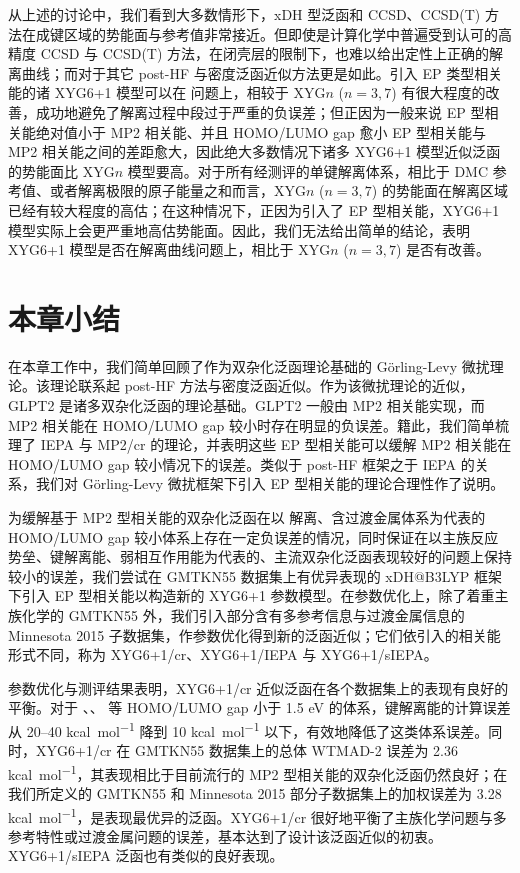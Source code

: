 从上述的讨论中，我们看到大多数情形下，xDH 型泛函和 CCSD、CCSD(T) 方法在成键区域的势能面与参考值非常接近。但即使是计算化学中普遍受到认可的高精度 CCSD 与 CCSD(T) 方法，在闭壳层的限制下，也难以给出定性上正确的解离曲线；而对于其它 post-HF 与密度泛函近似方法更是如此。引入 EP 类型相关能的诸 XYG6+1 模型可以在  问题上，相较于 XYG$n$ ($n=3,7$) 有很大程度的改善，成功地避免了解离过程中段过于严重的负误差；但正因为一般来说 EP 型相关能绝对值小于 MP2 相关能、并且 HOMO/LUMO gap 愈小 EP 型相关能与 MP2 相关能之间的差距愈大，因此绝大多数情况下诸多 XYG6+1 模型近似泛函的势能面比 XYG$n$ 模型要高。对于所有经测评的单键解离体系，相比于 DMC 参考值、或者解离极限的原子能量之和而言，XYG$n$ ($n=3,7$) 的势能面在解离区域已经有较大程度的高估；在这种情况下，正因为引入了 EP 型相关能，XYG6+1 模型实际上会更严重地高估势能面。因此，我们无法给出简单的结论，表明 XYG6+1 模型是否在解离曲线问题上，相比于 XYG$n$ ($n=3,7$) 是否有改善。

\section{本章小结}

在本章工作中，我们简单回顾了作为双杂化泛函理论基础的 G\"orling-Levy 微扰理论。该理论联系起 post-HF 方法与密度泛函近似。作为该微扰理论的近似，GLPT2 是诸多双杂化泛函的理论基础。GLPT2 一般由 MP2 相关能实现，而 MP2 相关能在 HOMO/LUMO gap 较小时存在明显的负误差。籍此，我们简单梳理了 IEPA 与 MP2/cr 的理论，并表明这些 EP 型相关能可以缓解 MP2 相关能在 HOMO/LUMO gap 较小情况下的误差。类似于 post-HF 框架之于 IEPA 的关系，我们对 G\"orling-Levy 微扰框架下引入 EP 型相关能的理论合理性作了说明。

为缓解基于 MP2 型相关能的双杂化泛函在以  解离、含过渡金属体系为代表的 HOMO/LUMO gap 较小体系上存在一定负误差的情况，同时保证在以主族反应势垒、键解离能、弱相互作用能为代表的、主流双杂化泛函表现较好的问题上保持较小的误差，我们尝试在 GMTKN55 数据集上有优异表现的 xDH@B3LYP 框架下引入 EP 型相关能以构造新的 XYG6+1 参数模型。在参数优化上，除了着重主族化学的 GMTKN55 外，我们引入部分含有多参考信息与过渡金属信息的 Minnesota 2015 子数据集，作参数优化得到新的泛函近似；它们依引入的相关能形式不同，称为 XYG6+1/cr、XYG6+1/IEPA 与 XYG6+1/sIEPA。

参数优化与测评结果表明，XYG6+1/cr 近似泛函在各个数据集上的表现有良好的平衡。对于 、、 等 HOMO/LUMO gap 小于 1.5 eV 的体系，键解离能的计算误差从 20--40 \si{kcal.mol^{-1}} 降到 10 \si{kcal.mol^{-1}} 以下，有效地降低了这类体系误差。同时，XYG6+1/cr 在 GMTKN55 数据集上的总体 WTMAD-2 误差为 2.36 \si{kcal.mol^{-1}}，其表现相比于目前流行的 MP2 型相关能的双杂化泛函仍然良好；在我们所定义的 GMTKN55 和 Minnesota 2015 部分子数据集上的加权误差为 3.28 \si{kcal.mol^{-1}}，是表现最优异的泛函。XYG6+1/cr 很好地平衡了主族化学问题与多参考特性或过渡金属问题的误差，基本达到了设计该泛函近似的初衷。XYG6+1/sIEPA 泛函也有类似的良好表现。

